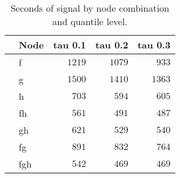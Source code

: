 \begin{table}[!tbp]
\caption{Seconds of signal by node combination and quantile level.\label{}} 
\begin{center}
\begin{tabular}{llrrr}
\hline\hline
\multicolumn{1}{l}{}&\multicolumn{1}{c}{Node}&\multicolumn{1}{c}{tau 0.1}&\multicolumn{1}{c}{tau 0.2}&\multicolumn{1}{c}{tau 0.3}\tabularnewline
\hline
&f&$1219$&$1079$&$ 933$\tabularnewline
&g&$1500$&$1410$&$1363$\tabularnewline
&h&$ 703$&$ 594$&$ 605$\tabularnewline
&fh&$ 561$&$ 491$&$ 487$\tabularnewline
&gh&$ 621$&$ 529$&$ 540$\tabularnewline
&fg&$ 891$&$ 832$&$ 764$\tabularnewline
&fgh&$ 542$&$ 469$&$ 469$\tabularnewline
\hline
\end{tabular}\end{center}
\end{table}
